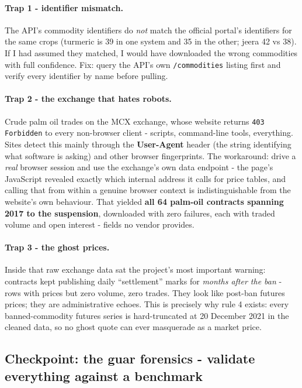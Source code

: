 \documentclass[11pt]{article}
\begin{document}
\paragraph{Trap 1 - identifier mismatch.} The API's commodity identifiers do \emph{not}
match the official portal's identifiers for the same crops (turmeric is 39 in one system
and 35 in the other; jeera 42 vs 38). If I had assumed they matched, I would have
downloaded the wrong commodities with full confidence. Fix: query the API's own
\texttt{/commodities} listing first and verify every identifier by name before pulling.

\paragraph{Trap 2 - the exchange that hates robots.} Crude palm oil trades on the MCX
exchange, whose website returns \texttt{403 Forbidden} to every non-browser client -
scripts, command-line tools, everything. Sites detect this mainly through the
\textbf{User-Agent} header (the string identifying what software is asking) and other
browser fingerprints. The workaround: drive a \emph{real} browser session and use the
exchange's own data endpoint - the page's JavaScript revealed exactly which internal
address it calls for price tables, and calling that from within a genuine browser context
is indistinguishable from the website's own behaviour. That yielded \textbf{all 64
palm-oil contracts spanning 2017 to the suspension}, downloaded with zero failures, each
with traded volume and open interest - fields no vendor provides.

\paragraph{Trap 3 - the ghost prices.} Inside that raw exchange data sat the project's
most important warning: contracts kept publishing daily ``settlement'' marks for
\emph{months after the ban} - rows with prices but zero volume, zero trades. They look
like post-ban futures prices; they are administrative echoes. This is precisely why rule 4
exists: every banned-commodity futures series is hard-truncated at 20 December 2021 in the
cleaned data, so no ghost quote can ever masquerade as a market price.

\subsection{Checkpoint: the guar forensics - validate everything against a benchmark}
\end{document}
